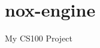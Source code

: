 \chapter{nox-\/engine}
\hypertarget{index}{}\label{index}
\label{index_md_README}%
%


My CS100 Project 